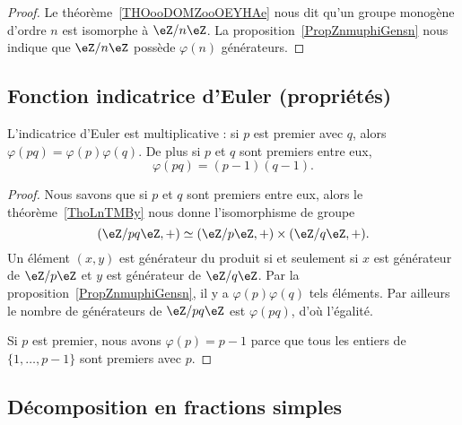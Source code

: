 \begin{proof}
    Le théorème~\ref{THOooDOMZooOEYHAe} nous dit qu'un groupe monogène d'ordre \( n\) est isomorphe à \( \eZ/n\eZ\). La proposition~\ref{PropZnmuphiGensn} nous indique que \( \eZ/n\eZ\) possède \( \varphi(n)\) générateurs.
\end{proof}

\subsection{Fonction indicatrice d'Euler (propriétés)}
\label{subSecKGDFooAbETjs}

\begin{corollary}       \label{CorlvTmsf}
    L'indicatrice d'Euler est multiplicative : si \( p\) est premier avec \( q\), alors \( \varphi(pq)=\varphi(p)\varphi(q)\). De plus si \( p\) et \( q\) sont premiers entre eux,
    \begin{equation}
        \varphi(pq)=(p-1)(q-1).
    \end{equation}
\end{corollary}

\begin{proof}
    Nous savons que si \( p\) et \( q\) sont premiers entre eux, alors le théorème~\ref{ThoLnTMBy} nous donne l'isomorphisme de groupe
    \begin{equation}
        (\eZ/pq\eZ,+)\simeq(\eZ/p\eZ,+)\times(\eZ/q\eZ,+).
    \end{equation}
    Un élément \( (x,y)\) est générateur du produit si et seulement si \( x\) est générateur de \( \eZ/p\eZ\) et \( y\) est générateur de \( \eZ/q\eZ\). Par la proposition~\ref{PropZnmuphiGensn}, il y a \( \varphi(p)\varphi(q)\) tels éléments. Par ailleurs le nombre de générateurs de \( \eZ/pq\eZ\) est \( \varphi(pq)\), d'où l'égalité.

    Si \( p\) est premier, nous avons \( \varphi(p)=p-1\) parce que tous les entiers de \( \{ 1,\ldots, p-1 \}\) sont premiers avec \( p\).
\end{proof}

\subsection{Décomposition en fractions simples}
\label{SUBSECooSIYXooDDHUdD}



